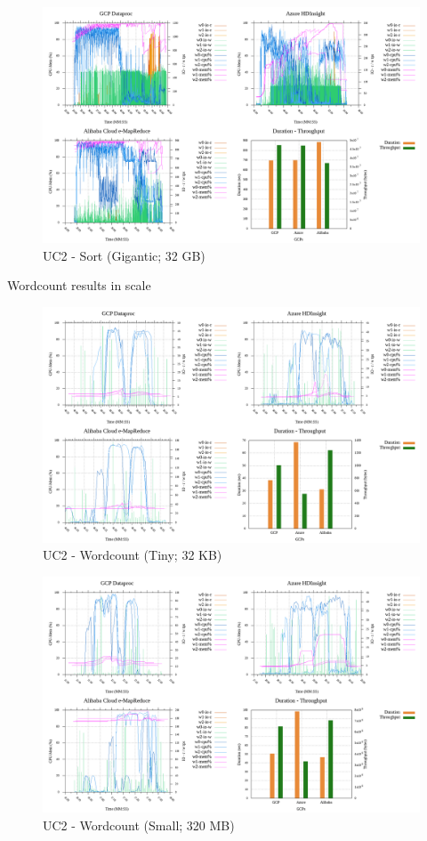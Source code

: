 \documentclass[review]{elsarticle}
\begin{document}
\begin{figure}[p]
	\caption{UC2 - Sort (Gigantic; 32 GB)}
	\label{fig:uc2-srt-g-cmidt}
	\includegraphics[width=\textwidth]{uc2-srt-g-cmidt}
	\centering
\end{figure}

Wordcount results in scale

\begin{figure}[p]
	\caption{UC2 - Wordcount (Tiny; 32 KB)}
	\label{fig:uc2-wrdcnt-t-cmidt}
	\includegraphics[width=\textwidth]{uc2-wrdcnt-t-cmidt}
	\centering
\end{figure}

\begin{figure}[p]
	\caption{UC2 - Wordcount (Small; 320 MB)}
	\label{fig:uc2-wrdcnt-s-cmidt}
	\includegraphics[width=\textwidth]{uc2-wrdcnt-s-cmidt}
	\centering
\end{figure}
\end{document}
